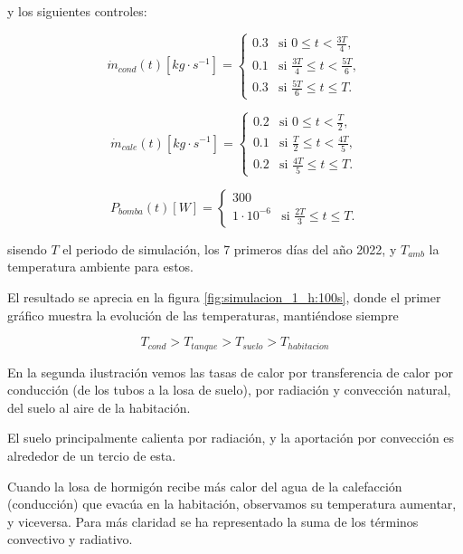 y los siguientes controles:

\begin{equation}
	\dot{m}_{cond}(t)[kg \cdot s^{-1}] =
	\begin{cases}
		0.3 & \text{si } 0 \leq t < \frac{3T}{4},            \\
		0.1 & \text{si } \frac{3T}{4} \leq t < \frac{5T}{6}, \\
		0.3 & \text{si } \frac{5T}{6} \leq t \leq T.
	\end{cases}
\end{equation}

\begin{equation}
	\dot{m}_{cale}(t)[kg \cdot s^{-1}] =
	\begin{cases}
		0.2 & \text{si } 0 \leq t < \frac{T}{2},            \\
		0.1 & \text{si } \frac{T}{2} \leq t < \frac{4T}{5}, \\
		0.2 & \text{si } \frac{4T}{5} \leq t \leq T.
	\end{cases}
\end{equation}

\begin{equation}
	P_{bomba}(t)[W] =
	\begin{cases}
		300                                                      \\
		1 \cdot 10^{-6} & \text{si } \frac{2T}{3} \leq t \leq T.
	\end{cases}
\end{equation}

sisendo $T$ el periodo de simulación, los 7 primeros días del año 2022, y
$T_{amb}$ la temperatura ambiente para estos.

El resultado se aprecia en la figura \ref{fig:simulacion_1_h:100s},
donde el primer gráfico muestra la evolución de las temperaturas,
mantiéndose siempre

\begin{equation*}
	T_{cond} > T_{tanque} > T_{suelo} > T_{habitacion}
\end{equation*}

En la segunda ilustración vemos las tasas de calor por transferencia de calor
por conducción (de los tubos a la losa de suelo), por radiación y convección
natural, del suelo al aire de la habitación.

El suelo principalmente calienta por radiación, y la aportación por
convección es alrededor de un tercio de esta.

Cuando la losa de hormigón recibe más calor del agua de la calefacción
(conducción) que evacúa en la habitación, observamos su temperatura aumentar, y
viceversa. Para más claridad se ha representado la suma de los términos
convectivo y radiativo.

